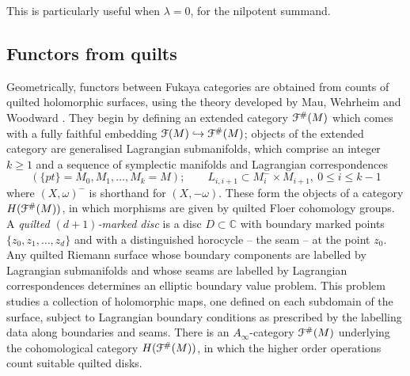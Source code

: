 \documentclass[reqno,10pt]{amsart}
\numberwithin{equation}{section}
\newcommand{\bC}{{\mathbb C}}
\newcommand{\scrF}{\EuScript{F}}
\theoremstyle{remark}
\begin{document}
This is particularly useful when $\lambda =0$, for the nilpotent summand.

\subsection{Functors from quilts\label{Section:Quilts}}

Geometrically, functors between Fukaya categories are obtained from counts of quilted holomorphic surfaces, using the theory developed by Mau, Wehrheim and Woodward \cite{WW1, WW2,MWW:Announce,Mau}.  They begin by defining an extended category $\scrF^{\#}(M)$ which comes with a fully faithful embedding $\scrF(M) \hookrightarrow \scrF^{\#}(M)$; objects of the extended category are generalised Lagrangian submanifolds, which comprise an integer $k\geq 1$ and a sequence of symplectic manifolds and Lagrangian correspondences
\[
(\{pt\}=M_0, M_1,\ldots, M_k=M); \qquad L_{i,i+1} \subset M_i^-\times M_{i+1}, \ 0\leq i\leq k-1
\]
where $(X,\omega)^-$ is shorthand for $(X,-\omega)$.  These form the objects of a category $H(\scrF^{\#}(M))$, in which morphisms are given by quilted Floer cohomology groups. A \emph{quilted $(d+1)$-marked disc} is a disc $D\subset \bC$ with boundary marked points $\{z_0, z_1, \ldots, z_d\}$ and with a distinguished horocycle -- the seam -- at the point $z_0$.   Any quilted Riemann surface whose boundary components are labelled by Lagrangian submanifolds and whose seams are labelled by Lagrangian correspondences determines an elliptic boundary value problem.   This problem studies a collection of holomorphic maps, one defined on each subdomain of the surface, subject to Lagrangian boundary conditions as prescribed by the labelling data along boundaries and seams. There is  an $A_{\infty}$-category $\scrF^{\#}(M)$ underlying the cohomological category $H(\scrF^{\#}(M))$, in which the higher order operations count suitable quilted disks.
\end{document}
